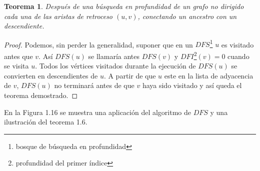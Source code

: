 \documentclass[10pt,a5paper]{book}
\newtheorem{teorema}{Teorema}[chapter]
\begin{document}
\begin{teorema}
Después de una búsqueda en profundidad de un grafo no dirigido cada una de las aristas de retroceso $(u,v)$, conectando un ancestro con un descendiente.
\end{teorema}
\begin{proof}
Podemos, sin perder la generalidad, suponer que en un $DFS$\footnote{bosque de búsqueda en profundidad} $u$ es visitado antes que $v$. Así $DFS(u)$ se llamaría antes $DFS(v)$ y $DFI$\footnote{profundidad del primer índice}$(v) = 0$ cuando se visita $u$. Todos los vértices visitados durante la ejecución de $DFS(u)$ se convierten en descendientes de $u$. A partir de que $u$ este en la lista de adyacencia de $v$, $DFS(u)$ no terminará antes de que $v$ haya sido visitado y así queda el teorema demostrado.
\end{proof}
En la Figura 1.16 se muestra una aplicación del algoritmo de $DFS$ y una ilustración del teorema 1.6.
\end{document}
